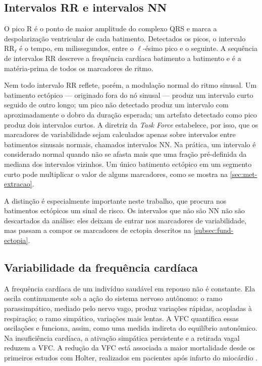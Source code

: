 \subsection{Intervalos RR e intervalos NN}
\label{subsec:fund-rr-nn}

O pico R é o ponto de maior amplitude do complexo QRS e marca a
despolarização ventricular de cada batimento. Detectados os picos, o
intervalo $\mathrm{RR}_\ell$ é o tempo, em milissegundos, entre o
$\ell$-ésimo pico e o seguinte. A sequência de intervalos RR descreve a
frequência cardíaca batimento a batimento e é a matéria-prima de todos os
marcadores de ritmo.

Nem todo intervalo RR reflete, porém, a modulação normal do ritmo sinusal.
Um batimento ectópico --- originado fora do nó sinusal --- produz um
intervalo curto seguido de outro longo; um pico não detectado produz um
intervalo com aproximadamente o dobro da duração esperada; um artefato
detectado como pico produz dois intervalos curtos. A diretriz da
\textit{Task Force} \cite{taskforce1996heart} estabelece, por isso, que os
marcadores de variabilidade sejam calculados apenas sobre intervalos entre
batimentos sinusais normais, chamados intervalos NN. Na prática, um
intervalo é considerado normal quando não se afasta mais que uma fração
pré-definida da mediana dos intervalos vizinhos. Um único batimento
ectópico em um segmento curto pode multiplicar o valor de alguns marcadores,
como se mostra na \autoref{sec:met-extracao}.

A distinção é especialmente importante neste trabalho, que procura nos
batimentos ectópicos um sinal de risco. Os intervalos que não são NN não
são descartados da análise: eles deixam de entrar nos marcadores de
variabilidade, mas passam a compor os marcadores de ectopia descritos na
\autoref{subsec:fund-ectopia}.

\subsection{Variabilidade da frequência cardíaca}
\label{subsec:fund-vfc}

A frequência cardíaca de um indivíduo saudável em repouso não é constante.
Ela oscila continuamente sob a ação do sistema nervoso autônomo: o ramo
parassimpático, mediado pelo nervo vago, produz variações rápidas,
acopladas à respiração; o ramo simpático, variações mais lentas. A
\gls{VFC} quantifica essas oscilações e funciona, assim, como uma medida
indireta do equilíbrio autonômico. Na insuficiência cardíaca, a ativação
simpática persistente e a retirada vagal reduzem a \gls{VFC}. A redução da
\gls{VFC} está associada a maior mortalidade desde os primeiros estudos com
Holter, realizados em pacientes após infarto do miocárdio
\cite{kleiger1987decreased}.

